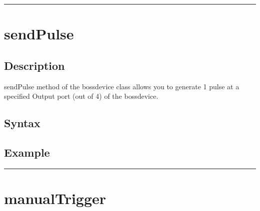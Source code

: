 \documentclass[letterpaper,10pt,english]{sphinxmanual}
\begin{document}
\bigskip\hrule\bigskip



\section{sendPulse}
\label{\detokenize{4_api_documentation:sendpulse}}

\subsection{Description}
\label{\detokenize{4_api_documentation:id1}}
sendPulse method of the bossdevice class allows you to generate 1 pulse at a specified Output port (out of 4) of the bossdevice.


\subsection{Syntax}
\label{\detokenize{4_api_documentation:id2}}
\begin{sphinxVerbatim}[commandchars=\\\{\}]
\PYG{p}{[}\PYG{p}{]} 
\end{sphinxVerbatim}


\subsection{Example}
\label{\detokenize{4_api_documentation:id3}}
\begin{sphinxVerbatim}[commandchars=\\\{\}]
 
 
\end{sphinxVerbatim}


\bigskip\hrule\bigskip



\section{manualTrigger}
\label{\detokenize{4_api_documentation:manualtrigger}}
\end{document}
